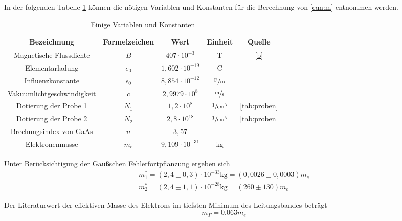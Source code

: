 In der folgenden Tabelle \ref{tab:var} können die nötigen Variablen und Konstanten für die Berechnung von \eqref{eqn:m} entnommen werden.
\begin{table}[H]
  \centering
  \begin{tabular}{ccccc}
    \toprule
    Bezeichnung & Formelzeichen & Wert & Einheit & Quelle \\
    \midrule
    Magnetische Flussdichte    & $B$          & $407\cdot10^{-3}$    & T                           & \eqref{b} \\
    Elementarladung            & $e_0$        & $1,602\cdot10^{-19}$ & C                           & \cite{pdg} \\
    Influenzkonstante          & $\epsilon_0$ & $8,854\cdot10^{-12}$ & $\sfrac{\text{F}}{\text{m}}$ & \cite{pdg} \\
    Vakuumlichtgeschwindigkeit & $c$          & $2,9979\cdot10^{8}$  & $\sfrac{\text{m}}{\text{s}}$               & \cite{pdg} \\
    Dotierung der Probe 1      & $N_1$        & $1,2\cdot10^{8}$     & $\sfrac{1}{\text{cm}^3}$     & \ref{tab:proben} \\
    Dotierung der Probe 2      & $N_2$        & $2,8\cdot10^{18}$    & $\sfrac{1}{\text{cm}^3}$     & \ref{tab:proben} \\
    Brechungsindex von GaAs    & $n$          & $3,57$               & -                           & \cite{cb} \\
    Elektronenmasse            & $m_e$        & $9,109\cdot10^{-31}$ & kg                          & \cite{pdg} \\
    \bottomrule
  \end{tabular}
  \caption{Einige Variablen und Konstanten}
  \label{tab:var}
\end{table}

Unter Berücksichtigung der Gaußschen Fehlerfortpflanzung ergeben sich
\begin{gather*}
  m_1^* = (2,4 \pm 0,3)\cdot10^{-33}\text{kg} = (0,0026 \pm 0,0003)m_e \\
  m_2^* = (2,4 \pm 1,1)\cdot10^{-28}\text{kg} = (260 \pm 130)m_e
\end{gather*}

Der Literaturwert der effektiven Masse des Elektrons im tiefsten Minimum des Leitungsbandes \cite{ru} beträgt
\begin{equation*}
  m_{\Gamma} = 0.063 m_e
\end{equation*}

